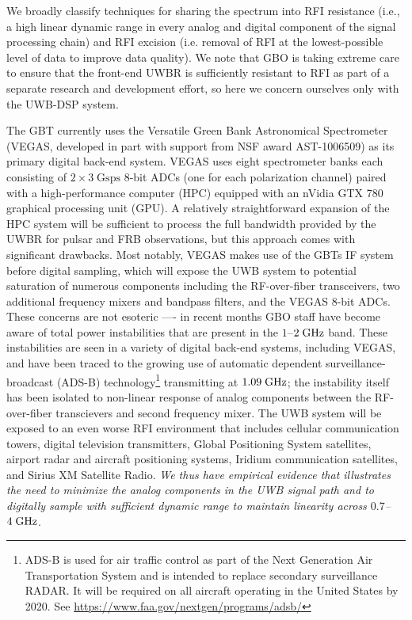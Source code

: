 \documentclass[10pt]{myNSF}
\begin{document}
We broadly classify techniques for sharing the spectrum into RFI
resistance (i.e., a high linear dynamic range in every analog and
digital component of the signal processing chain) and RFI excision
(i.e. removal of RFI at the lowest-possible level of data to improve
data quality).  We note that GBO is taking extreme care to ensure that
the front-end UWBR is sufficiently resistant to RFI as part of a
separate research and development effort, so here we concern ourselves
only with the UWB-DSP system.

 The GBT currently uses the Versatile
Green Bank Astronomical Spectrometer (VEGAS, developed in part with
support from NSF award AST-1006509) as its primary digital back-end
system.  VEGAS uses eight spectrometer banks each consisting of $2
\times 3\; \mathrm{Gsps}$ 8-bit ADCs (one for each polarization
channel) paired with a high-performance computer (HPC) equipped with
an nVidia GTX 780 graphical processing unit (GPU).  A relatively
straightforward expansion of the HPC system will be sufficient to
process the full bandwidth provided by the UWBR for pulsar and FRB
observations, but this approach comes with significant drawbacks.
Most notably, VEGAS makes use of the GBTs IF system before digital
sampling, which will expose the UWB system to potential saturation of
numerous components including the RF-over-fiber transceivers, two
additional frequency mixers and bandpass filters, and the VEGAS 8-bit
ADCs.  These concerns are not esoteric ---- in recent months GBO staff
have become aware of total power instabilities that are present in the
$1$--$2\; \textrm{GHz}$ band.  These instabilities are seen in a variety of
digital back-end systems, including VEGAS, and have been traced to the
growing use of automatic dependent surveillance-broadcast (ADS-B)
technology\footnote{ADS-B is used for air traffic control as part of
  the Next Generation Air Transportation System and is intended to
  replace secondary surveillance RADAR.  It will be required on all
  aircraft operating in the United States by 2020.  See
  \url{https://www.faa.gov/nextgen/programs/adsb/}} transmitting at
$1.09\; \textrm{GHz}$; the instability itself has been isolated to non-linear
response of analog components between the RF-over-fiber transcievers
and second frequency mixer.  The UWB system will be exposed to an even
worse RFI environment that includes cellular communication towers,
digital television transmitters, Global Positioning System satellites,
airport radar and aircraft positioning systems, Iridium communication
satellites, and Sirius XM Satellite Radio.  \emph{We thus have
  empirical evidence that illustrates the need to minimize the analog
  components in the UWB signal path and to digitally sample with
  sufficient dynamic range to maintain linearity across $0.7$--$4\;
  \textrm{GHz}$}.
\end{document}
